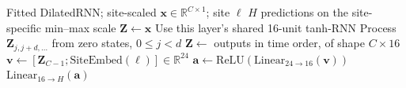\begin{algorithm}[H]
\caption{Direct forward pass of the DilatedRNN}
\label{alg:dilated-direct}
\footnotesize
\begin{algorithmic}[1]
\Require Fitted DilatedRNN; site-scaled $\mathbf x\in\mathbb R^{C\times1}$; site $\ell$
\Ensure $H$ predictions on the site-specific min--max scale
  \State $\mathbf Z\gets\mathbf x$
    \State Use this layer's shared 16-unit tanh-RNN
    \State Process $\mathbf Z_{j,j+d,\ldots}$ from zero states, $0\leq j<d$
    \State $\mathbf Z\gets$ outputs in time order, of shape $C\times16$
  \EndFor
  \State $\mathbf v\gets[\mathbf Z_{C-1};\mathrm{SiteEmbed}(\ell)]\in\mathbb R^{24}$
  \State $\mathbf a\gets\mathrm{ReLU}(\mathrm{Linear}_{24\to16}(\mathbf v))$
  \State \Return $\mathrm{Linear}_{16\to H}(\mathbf a)$
\end{algorithmic}
\end{algorithm}
